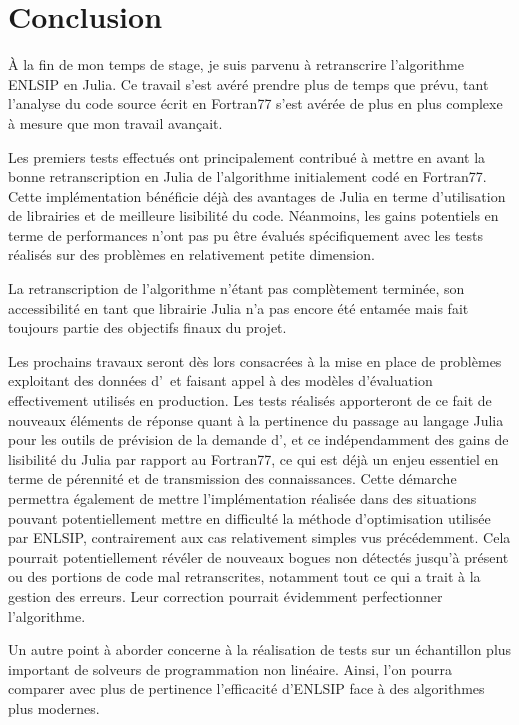 \chapter*{Conclusion}\label{Conclusion}

\`A la fin de mon temps de stage, je suis parvenu à retranscrire l'algorithme ENLSIP en Julia. Ce travail s'est avéré prendre plus de temps que prévu, 
tant l'analyse du code source écrit en Fortran77 s'est avérée de plus en plus complexe à mesure que mon travail avançait. 

Les premiers tests effectués ont principalement contribué à mettre en avant la bonne retranscription en Julia 
de l'algorithme initialement codé en Fortran77. Cette implémentation bénéficie déjà des avantages de Julia en terme d'utilisation de librairies et de meilleure 
lisibilité du code. Néanmoins, les gains potentiels en terme de performances n'ont pas pu être évalués spécifiquement avec les tests réalisés sur des problèmes 
en relativement petite dimension.

La retranscription de l'algorithme n'étant pas complètement terminée, son accessibilité en tant que librairie Julia 
 n'a pas encore été entamée mais fait toujours partie des objectifs finaux du projet. 

Les prochains travaux seront dès lors consacrées à la mise en place de problèmes exploitant des données d'\HQ\ et faisant appel à des modèles
d'évaluation effectivement utilisés en production. Les tests réalisés apporteront de ce fait de nouveaux éléments de réponse quant à la pertinence du passage au langage Julia
pour les outils de prévision de la demande d'\HQ, et ce indépendamment des gains de lisibilité du Julia par rapport au Fortran77, ce qui est déjà un enjeu essentiel 
en terme de pérennité et de transmission des connaissances. 
Cette démarche permettra également de mettre l'implémentation réalisée dans des situations pouvant potentiellement mettre en difficulté la méthode d'optimisation utilisée par ENLSIP, 
contrairement aux cas relativement simples vus précédemment. 
 Cela pourrait potentiellement révéler de nouveaux bogues non détectés jusqu'à présent ou des portions de code mal retranscrites, notamment tout ce qui a trait à la gestion des erreurs.
 Leur correction pourrait évidemment perfectionner l'algorithme. 
 
 Un autre point à aborder concerne à la réalisation de tests sur un échantillon plus important de solveurs de programmation non linéaire. 
 Ainsi, l'on pourra comparer avec plus de pertinence l'efficacité d'ENLSIP face à des algorithmes plus modernes. 

